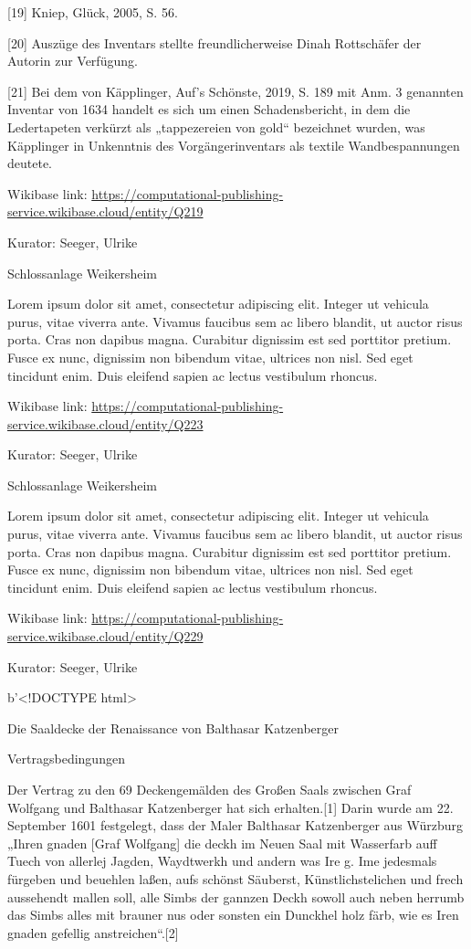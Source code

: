 \documentclass[
  letterpaper,
]{book}
\begin{document}
{[}19{]} Kniep, Glück, 2005, S. 56.

{[}20{]} Auszüge des Inventars stellte freundlicherweise Dinah
Rottschäfer der Autorin zur Verfügung.

{[}21{]} Bei dem von Käpplinger, Auf's Schönste, 2019, S. 189 mit Anm. 3
genannten Inventar von 1634 handelt es sich um einen Schadensbericht, in
dem die Ledertapeten verkürzt als „tappezereien von gold`` bezeichnet
wurden, was Käpplinger in Unkenntnis des Vorgängerinventars als textile
Wandbespannungen deutete.

Wikibase link:
\url{https://computational-publishing-service.wikibase.cloud/entity/Q219}

Kurator: Seeger, Ulrike

Schlossanlage Weikersheim

Lorem ipsum dolor sit amet, consectetur adipiscing elit. Integer ut
vehicula purus, vitae viverra ante. Vivamus faucibus sem ac libero
blandit, ut auctor risus porta. Cras non dapibus magna. Curabitur
dignissim est sed porttitor pretium. Fusce ex nunc, dignissim non
bibendum vitae, ultrices non nisl. Sed eget tincidunt enim. Duis
eleifend sapien ac lectus vestibulum rhoncus.

Wikibase link:
\url{https://computational-publishing-service.wikibase.cloud/entity/Q223}

Kurator: Seeger, Ulrike

Schlossanlage Weikersheim

Lorem ipsum dolor sit amet, consectetur adipiscing elit. Integer ut
vehicula purus, vitae viverra ante. Vivamus faucibus sem ac libero
blandit, ut auctor risus porta. Cras non dapibus magna. Curabitur
dignissim est sed porttitor pretium. Fusce ex nunc, dignissim non
bibendum vitae, ultrices non nisl. Sed eget tincidunt enim. Duis
eleifend sapien ac lectus vestibulum rhoncus.

Wikibase link:
\url{https://computational-publishing-service.wikibase.cloud/entity/Q229}

Kurator: Seeger, Ulrike

b'\textless!DOCTYPE html\textgreater{}

Die Saaldecke der Renaissance von Balthasar Katzenberger

Vertragsbedingungen

Der Vertrag zu den 69 Deckengemälden des Großen Saals zwischen Graf
Wolfgang und Balthasar Katzenberger hat sich erhalten.{[}1{]} Darin
wurde am 22. September 1601 festgelegt, dass der Maler Balthasar
Katzenberger aus Würzburg „Ihren gnaden {[}Graf Wolfgang{]} die deckh im
Neuen Saal mit Wasserfarb auff Tuech von allerlej Jagden, Waydtwerkh und
andern was Ire g. Ime jedesmals fürgeben und beuehlen laßen, aufs
schönst Säuberst, Künstlichstelichen und frech aussehendt mallen soll,
alle Simbs der gannzen Deckh sowoll auch neben herrumb das Simbs alles
mit brauner nus oder sonsten ein Dunckhel holz färb, wie es Iren gnaden
gefellig anstreichen``.{[}2{]}
\end{document}
